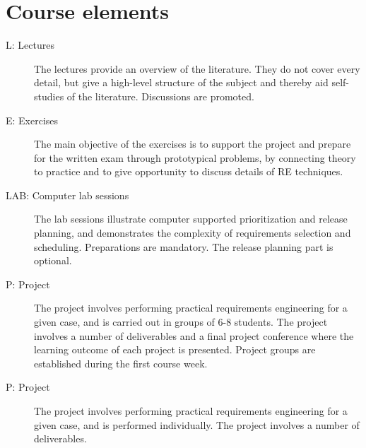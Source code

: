 \newpage

\section{Course elements}
\begin{description}
\item[L: Lectures] The lectures provide an overview of the literature. They do not cover every detail, but give a high-level structure of the subject and thereby aid self-studies of the literature. Discussions are promoted.
\item[E: Exercises] The main objective of the exercises is to support the project and prepare for the written exam through prototypical problems, by connecting theory to practice and to give opportunity to discuss details of RE techniques.
\item[LAB: Computer lab sessions] The lab sessions illustrate computer supported
prioritization and release planning, and demonstrates the complexity of requirements selection and scheduling. Preparations are mandatory. %
\ifteknolog\else
The release planning part is optional.
\fi
\ifteknolog
	\item[P: Project] The project involves performing practical requirements engineering for a given case, and is carried out in groups of 6-8 students. The project involves a number of deliverables and a final project conference where the learning outcome of each project is presented. Project groups are established during the first course week.
\else
	\item[P: Project] The project involves performing practical requirements engineering for a given case, and is performed individually. The project involves a number of deliverables.
\fi

\end{description}




